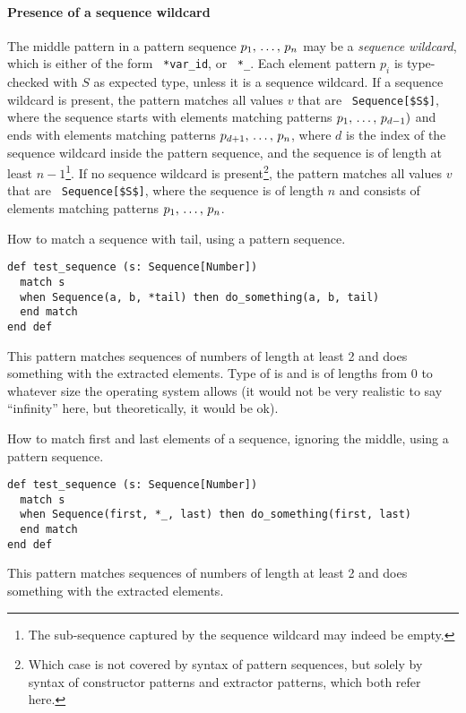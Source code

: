 \paragraph{Presence of a sequence wildcard}
The middle pattern in a pattern sequence $p_1 ,\, \ldots ,\, p_n$ may be a {\em sequence wildcard}, which is either of the form ~\lstinline!*var_id!, or ~\lstinline!*_!. Each element pattern $p_i$ is type-checked with $S$ as expected type, unless it is a sequence wildcard. If a sequence wildcard is present, the pattern matches all values $v$ that are ~\lstinline!Sequence[$S$]!, where the sequence starts with elements matching patterns $p_1 ,\, \ldots ,\, p_{d-1})$ and ends with elements matching patterns $p_{d+1} ,\, \ldots ,\, p_n$, where $d$ is the index of the sequence wildcard inside the pattern sequence, and the sequence is of length at least $n-1$\footnote{The sub-sequence captured by the sequence wildcard may indeed be empty.}. If no sequence wildcard is present\footnote{Which case is not covered by syntax of pattern sequences, but solely by syntax of constructor patterns and extractor patterns, which both refer here.}, the pattern matches all values $v$ that are ~\lstinline!Sequence[$S$]!, where the sequence is of length $n$ and consists of elements matching patterns $p_1 ,\, \ldots ,\, p_n$. 

\example How to match a sequence with tail, using a pattern sequence.
\begin{lstlisting}
def test_sequence (s: Sequence[Number])
  match s 
  when Sequence(a, b, *tail) then do_something(a, b, tail)
  end match
end def
\end{lstlisting}
This pattern matches sequences of numbers of length at least 2 and does something with the extracted elements. Type of  is  and is of lengths from 0 to whatever size the operating system allows (it would not be very realistic to say ``infinity'' here, but theoretically, it would be ok). 

\example How to match first and last elements of a sequence, ignoring the middle, using a pattern sequence.
\begin{lstlisting}
def test_sequence (s: Sequence[Number])
  match s 
  when Sequence(first, *_, last) then do_something(first, last)
  end match
end def
\end{lstlisting}
This pattern matches sequences of numbers of length at least 2 and does something with the extracted elements. 

